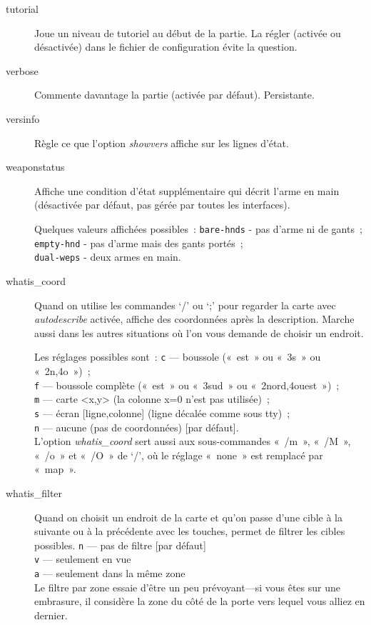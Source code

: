 \documentclass[titlepage]{article}
\begin{document}
\begin{description}
\item[{tutorial}]
Joue un niveau de tutoriel au début de la partie.
La régler (activée ou désactivée) dans le fichier de configuration évite
la question.

\item[{verbose}]
Commente davantage la partie (activée par défaut).
Persistante.

\item[{versinfo}]
Règle ce que l'option
\textit{showvers}
affiche sur les lignes d'état.

\item[{weaponstatus}]
Affiche une condition d'état supplémentaire qui décrit l'arme en main
(désactivée par défaut, pas gérée par toutes les interfaces).


Quelques valeurs affichées possibles~:
\texttt{bare-hnds} - pas d'arme ni de gants~;\\
\texttt{empty-hnd} - pas d'arme mais des gants portés~;\\
\texttt{dual-weps} - deux armes en main.\\

\item[{whatis\_coord}]
Quand on utilise les commandes `/' ou `;' pour regarder la carte
avec
\textit{autodescribe}
activée, affiche des coordonnées après la description.
Marche aussi dans les autres situations où l'on vous demande de choisir un
endroit.


Les réglages possibles sont~:
\texttt{c} --- boussole («~est~» ou «~3s~» ou «~2n,4o~»)~;\\
\texttt{f} --- boussole complète («~est~» ou «~3sud~» ou «~2nord,4ouest~»)~;\\
\texttt{m} --- carte \textless{}x,y\textgreater{} (la colonne x=0 n'est pas utilisée)~;\\
\texttt{s} --- écran [ligne,colonne] (ligne décalée comme sous tty)~;\\
\texttt{n} --- aucune (pas de coordonnées) [par défaut].\\
L'option
\textit{whatis\_coord}
sert aussi aux sous-commandes «~/m~», «~/M~», «~/o~» et
«~/O~» de `/', où le réglage «~none~» est remplacé par
«~map~».

\item[{whatis\_filter}]
Quand on choisit un endroit de la carte et qu'on passe d'une cible à la
suivante ou à la précédente avec les touches, permet de filtrer les cibles
possibles.
\texttt{n} --- pas de filtre [par défaut]\\
\texttt{v} --- seulement en vue\\
\texttt{a} --- seulement dans la même zone\\
Le filtre par zone essaie d'être un peu prévoyant---si vous êtes sur une
embrasure, il considère la zone du côté de la porte vers lequel vous alliez
en dernier.



\end{description}
\end{document}
